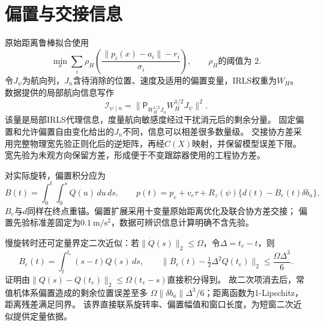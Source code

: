 \documentclass[11pt,a4paper]{ctexart}
\newcommand{\Proj}{\mathsf P}
\begin{document}
\section{偏置与交接信息}
原始距离鲁棒拟合使用
\begin{equation}
 \min_x\sum_i \rho_H\!\left(\frac{\|p_i(x)-a_i\|-r_i}{\sigma_i}\right),
 \qquad \rho_H\text{的阈值为 }2.
\end{equation}
令$J_\psi$为航向列，$J_n$含待消除的位置、速度及适用的偏置变量，IRLS权重为$W_H$。
数据提供的局部航向信息写作
\begin{equation}
 \mathcal I_{\psi\mid n}
 =\|\Proj_{W_H^{1/2}J_n}W_H^{1/2}J_\psi\|^2.
\end{equation}
该量是局部IRLS代理信息，度量航向敏感度经过干扰消元后的剩余分量。
固定偏置和允许偏置自由变化给出的$J_n$不同，信息可以相差很多数量级。
交接协方差采用完整物理宽先验正则化后的逆矩阵，再经$C(X)$映射，并保留模型误差下限。
宽先验为未观方向保留方差，形成便于不变跟踪器使用的工程协方差。

对实际旋转，偏置积分应为
\begin{equation}
 B(t)=\int_0^t\int_0^s Q(u)\,du\,ds,\qquad
 p(t)=p_e+v_e\tau+R_z(\psi)\{d(t)-B_e(t)\delta b_a\},
\end{equation}
$B_e$与$d$同样在终点重锚。偏置扩展采用十变量原始距离优化及联合协方差交接；
偏置先验标准差固定为$0.1\ \mathrm{m/s^2}$，数据可辨识信息计算明确不含先验。

慢旋转时还可定量界定二次近似：若$\|\dot Q(s)\|_2\leq\Omega$，令$\Delta=t_e-t$，则
\begin{equation}
 B_e(t)=\int_t^{t_e}(s-t)Q(s)\,ds,\qquad
 \big\|B_e(t)-\tfrac12\Delta^2Q(t_e)\big\|_2\leq\frac{\Omega\Delta^3}{6}.
\end{equation}
证明由$\|Q(s)-Q(t_e)\|_2\leq\Omega(t_e-s)$直接积分得到。
故二次项消去后，常值机体系偏置造成的剩余位置误差至多
$\Omega\|\delta b_a\|\Delta^3/6$；距离函数为1-Lipschitz，距离残差满足同界。
该界直接联系旋转率、偏置幅值和窗口长度，为短窗二次近似提供定量依据。
\end{document}
